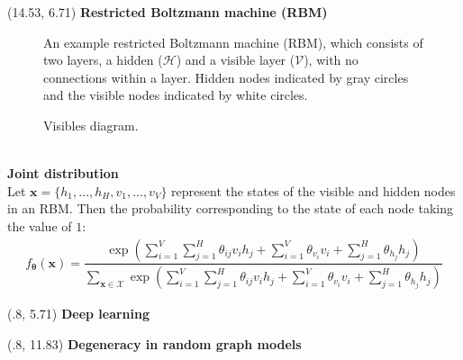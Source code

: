 \documentclass[extrafontsizes, 30pt]{memoir}
\begin{document}
\begin{textblock}{18.01}(14.53, 6.71)
{\large \bfseries Restricted Boltzmann machine (RBM)}

\begin{figure}[ht]
  \centering
  \resizebox{\linewidth}{!}{}
  \caption{An example restricted Boltzmann machine (RBM), which consists of two layers, a hidden ($\mathcal{H}$) and a visible layer ($\mathcal{V}$), with no connections within a layer. Hidden nodes indicated by gray circles and the visible nodes indicated by white circles.}
  \label{fig:rbm}
\end{figure}

\begin{figure}[ht]
  \centering
  
  \caption{Visibles diagram.}
  \label{fig:visibles}
\end{figure}

~\\[-1cm]
{\bfseries Joint distribution} \\[.25cm]
Let $\boldsymbol x = \{h_1, \dots, h_H, v_1,\dots,v_V\}$ represent the states of the visible and hidden nodes in an RBM. Then  the probability corresponding to the state of each node taking the value of $1$:
\begin{align}
\label{eqn:pmf}
f_{\boldsymbol \theta} (\boldsymbol x) = \dfrac{\exp\left(\sum\limits_{i = 1}^V \sum\limits_{j=1}^H \theta_{ij} v_i h_j + \sum\limits_{i = 1}^V\theta_{v_i} v_i + \sum\limits_{j = 1}^H\theta_{h_j} h_j\right)}{\sum\limits_{\boldsymbol x \in \mathcal{X}}\exp\left(\sum\limits_{i = 1}^V \sum\limits_{j=1}^H \theta_{ij} v_i h_j + \sum\limits_{i = 1}^V\theta_{v_i} v_i + \sum\limits_{j = 1}^H\theta_{h_j} h_j\right)} 
\end{align}
\end{textblock}

\begin{textblock}{14.08}(.8, 5.71)
{\large \bfseries Deep learning}

\end{textblock}

\begin{textblock}{14.08}(.8, 11.83)
{\large \bfseries Degeneracy in random graph models}

\end{textblock}
\end{document}
